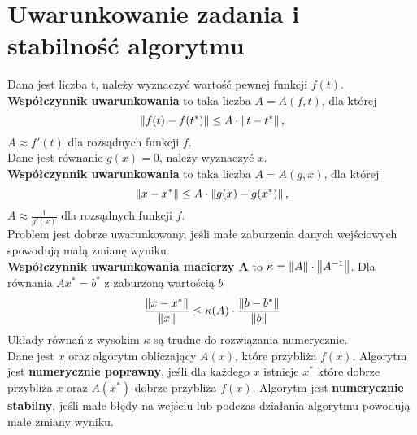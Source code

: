 \section{Uwarunkowanie zadania i stabilność algorytmu}
Dana jest liczba t, należy wyznaczyć wartość pewnej funkcji \( f(t) \). \\
\textbf{Współczynnik uwarunkowania} to taka liczba \( A = A(f,t) \), dla której
\[
    \left\Vert f(t) - f(t^*) \right\Vert \leq  A\cdot\left\Vert t - t^* \right\Vert,
\]
\( A \approx f'(t) \) dla rozsądnych funkcji \( f \). \\

\noindent
Dane jest równanie \( g(x) = 0 \), należy wyznaczyć \( x \). \\
\textbf{Współczynnik uwarunkowania} to taka liczba \( A = A(g,x) \), dla której
\[
    \left\Vert x - x^* \right\Vert \leq  A\cdot\left\Vert g(x) - g(x^*) \right\Vert,
\]
\( A \approx \frac{1}{g'(x)} \) dla rozsądnych funkcji \( f \). \\
Problem jest dobrze uwarunkowany, jeśli małe zaburzenia
danych wejściowych spowodują małą zmianę wyniku. \\

\noindent
\textbf{Współczynnik uwarunkowania macierzy A} to \( \kappa = \left\Vert A \right\Vert \cdot \left\Vert A^{-1} \right\Vert \). Dla równania \( Ax^* = b^* \) z zaburzoną wartością \( b \)
\[
    \frac{\left\Vert x-x^* \right\Vert}{\left\Vert x \right\Vert} \leq \kappa(A) \cdot \frac{\left\Vert b-b^* \right\Vert}{\left\Vert b \right\Vert}
\]
Układy równań z wysokim \( \kappa \) są trudne do rozwiązania numerycznie. \\

\noindent
Dane jest \( x \) oraz algorytm obliczający \( A(x) \), które przybliża \( f(x) \). Algorytm jest \textbf{numerycznie poprawny}, jeśli dla każdego \( x \) istnieje \( x^* \) które dobrze przybliża \( x \) oraz \( A(x^*) \) dobrze przybliża \( f(x) \).
Algorytm jest \textbf{numerycznie stabilny}, jeśli małe błędy na wejściu
lub podczas działania algorytmu powodują małe zmiany wyniku.
